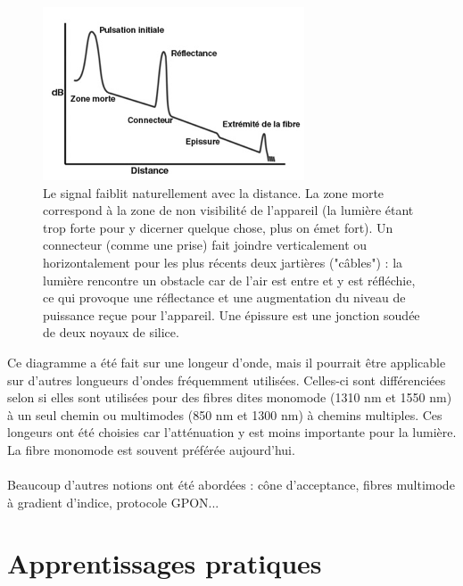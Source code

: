 \begin{figure}[H]
      \centering
      \includegraphics[width=\textwidth - \textwidth / 5]{ressources/r306/00.png}
      \caption{Le signal faiblit naturellement avec la distance. La zone morte correspond à la zone de non visibilité de l'appareil (la lumière étant trop forte pour y dicerner quelque chose, plus on émet fort). Un connecteur (comme une prise) fait joindre verticalement ou horizontalement pour les plus récents deux jartières ("câbles") : la lumière rencontre un obstacle car de l'air est entre et y est réfléchie, ce qui provoque une réflectance et une augmentation du niveau de puissance reçue pour l'appareil. Une épissure est une jonction soudée de deux noyaux de silice.}
      \label{fig:r306-00}
\end{figure}

Ce diagramme a été fait sur une longeur d'onde, mais il pourrait être applicable sur d'autres longueurs d'ondes fréquemment utilisées. Celles-ci sont différenciées selon si elles sont utilisées pour des fibres dites monomode (1310 nm et 1550 nm) à un seul chemin ou multimodes (850 nm et 1300 nm) à chemins multiples. Ces longeurs ont été choisies car l'atténuation y est moins importante pour la lumière. La fibre monomode est souvent préférée aujourd'hui.
\\ \\
Beaucoup d'autres notions ont été abordées : cône d'acceptance, fibres multimode à gradient d'indice, protocole GPON...

\section{Apprentissages pratiques}

